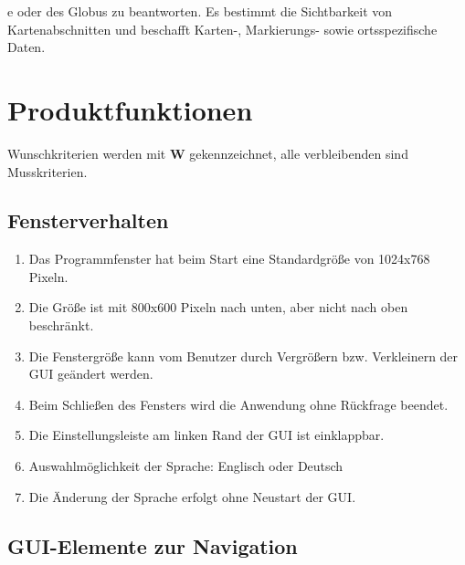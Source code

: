 \documentclass[10pt]{scrreprt}
\newcommand{\sfbf}[1]{\textbf{\sffamily #1}}
\newcommand{\W}{\sfbf{W}}
\newcommand{\ziel}[1]{{\fontsize{9.5}{11}\textsf{/#1/}}}
\newcommand{\ziellabel}{Z}
\newcommand{\muss}{\renewcommand{\labelenumi}{\textbf{\ziel{\ziellabel\numprint{\theenumi}0}}}}
\newcommand{\wunsch}{\renewcommand{\labelenumi}{\textbf{\ziel{\ziellabel\numprint{\theenumi}0W}}}}
\begin{document}
e oder des Globus zu beantworten. Es bestimmt die Sichtbarkeit von Kartenabschnitten und beschafft Karten-, Markierungs- sowie ortsspezifische Daten.


\chapter{Produktfunktionen}

\muss
\renewcommand{\ziellabel}{F}

Wunschkriterien werden mit {\W } gekennzeichnet, alle verbleibenden sind Musskriterien.

\section{Fensterverhalten}
\begin{enumerate}[leftmargin=2.2cm]
\item Das Programmfenster hat beim Start eine Standardgröße von 1024x768 Pixeln. 
\item Die Größe ist mit 800x600 Pixeln nach unten, aber nicht nach oben beschränkt. 
\item Die Fenstergröße kann vom Benutzer durch Vergrößern bzw. Verkleinern der GUI geändert werden.
\item Beim Schließen des Fensters wird die Anwendung ohne Rückfrage beendet.
\item Die Einstellungsleiste am linken Rand der GUI ist einklappbar.
\item Auswahlmöglichkeit der Sprache: Englisch oder Deutsch
\item Die Änderung der Sprache erfolgt ohne Neustart der GUI.
\end{enumerate}

\section{GUI-Elemente zur Navigation}
\end{document}
